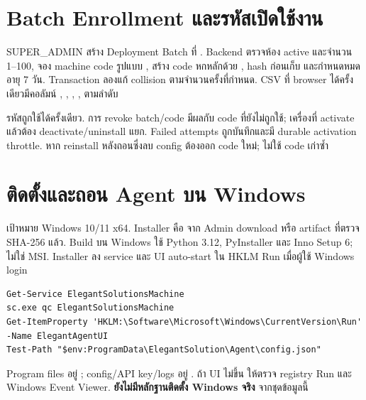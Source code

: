 \chapter{Batch Enrollment และรหัสเปิดใช้งาน}
SUPER\_ADMIN สร้าง Deployment Batch ที่ . Backend ตรวจห้อง active และจำนวน 1--100, จอง machine code รูปแบบ , สร้าง code หกหลักด้วย , hash ก่อนเก็บ และกำหนดหมดอายุ 7 วัน. Transaction ลองแก้ collision ตามจำนวนครั้งที่กำหนด. CSV ที่ browser ได้ครั้งเดียวมีคอลัมน์ , , , ,  ตามลำดับ
\begin{enumerate}
\end{enumerate}
รหัสถูกใช้ได้ครั้งเดียว. การ revoke batch/code มีผลกับ code ที่ยังไม่ถูกใช้; เครื่องที่ activate แล้วต้อง deactivate/uninstall แยก. Failed attempts ถูกบันทึกและมี durable activation throttle. หาก reinstall หลังถอนซึ่งลบ config ต้องออก code ใหม่; ไม่ใช้ code เก่าซ้ำ

\chapter{ติดตั้งและถอน Agent บน Windows}
เป้าหมาย Windows 10/11 x64. Installer คือ  จาก Admin download หรือ artifact ที่ตรวจ SHA-256 แล้ว. Build บน Windows ใช้ Python 3.12, PyInstaller และ Inno Setup 6; ไม่ใช่ MSI. Installer ลง service  และ UI auto-start ใน HKLM Run เมื่อผู้ใช้ Windows login
\begin{enumerate}
\end{enumerate}
\begin{lstlisting}
Get-Service ElegantSolutionsMachine
sc.exe qc ElegantSolutionsMachine
Get-ItemProperty 'HKLM:\Software\Microsoft\Windows\CurrentVersion\Run' -Name ElegantAgentUI
Test-Path "$env:ProgramData\ElegantSolution\Agent\config.json"
\end{lstlisting}
Program files อยู่ ; config/API key/logs อยู่ . ถ้า UI ไม่ขึ้น ให้ตรวจ registry Run และ Windows Event Viewer. \textbf{ยังไม่มีหลักฐานติดตั้ง Windows จริง} จากชุดข้อมูลนี้
